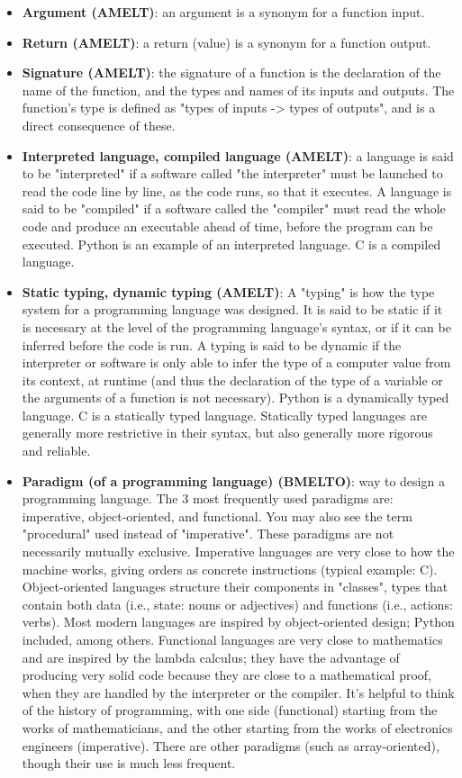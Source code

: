 \documentclass{article}
\begin{document}
\begin{itemize}
	\item \textbf{Argument (AMELT)}: an argument is a synonym for a function input.

	\item \textbf{Return (AMELT)}: a return (value) is a synonym for a function output.

	\item \textbf{Signature (AMELT)}: the signature of a function is the declaration of the name of the function, and the types and names of its inputs and outputs. The function's type is defined as "types of inputs -> types of outputs", and is a direct consequence of these.

	\item \textbf{Interpreted language, compiled language (AMELT)}: a language is said to be "interpreted" if a software called "the interpreter" must be launched to read the code line by line, as the code runs, so that it executes. A language is said to be "compiled" if a software called the "compiler" must read the whole code and produce an executable ahead of time, before the program can be executed. Python is an example of an interpreted language. C is a compiled language.

	\item \textbf{Static typing, dynamic typing (AMELT)}: A "typing" is how the type system for a programming language was designed. It is said to be static if it is necessary at the level of the programming language's syntax, or if it can be inferred before the code is run. A typing is said to be dynamic if the interpreter or software is only able to infer the type of a computer value from its context, at runtime (and thus the declaration of the type of a variable or the arguments of a function is not necessary). Python is a dynamically typed language. C is a statically typed language. Statically typed languages are generally more restrictive in their syntax, but also generally more rigorous and reliable.

	\item \textbf{Paradigm (of a programming language) (BMELTO)}: way to design a programming language. The 3 most frequently used paradigms are: imperative, object-oriented, and functional. You may also see the term "procedural" used instead of "imperative". These paradigms are not necessarily mutually exclusive. Imperative languages are very close to how the machine works, giving orders as concrete instructions (typical example: C). Object-oriented languages structure their components in "classes", types that contain both data (i.e., state: nouns or adjectives) and functions (i.e., actions: verbs). Most modern languages are inspired by object-oriented design; Python included, among others. Functional languages are very close to mathematics and are inspired by the lambda calculus; they have the advantage of producing very solid code because they are close to a mathematical proof, when they are handled by the interpreter or the compiler. It's helpful to think of the history of programming, with one side (functional) starting from the works of mathematicians, and the other starting from the works of electronics engineers (imperative). There are other paradigms (such as array-oriented), though their use is much less frequent.


\end{itemize}
\end{document}
